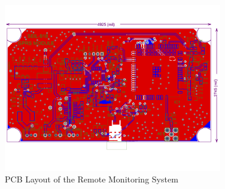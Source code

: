 \begin{figure}[H]
    \centering
    \includegraphics[width=0.85\textwidth]{images/pcb.png}
    \caption{PCB Layout of the Remote Monitoring System}
    \label{fig:pcb_rms}
\end{figure}